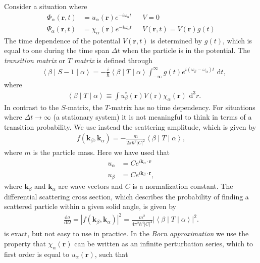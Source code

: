 \documentclass[10pt,twoside, b5paper,pdftex]{report}
\newcommand{\matrixel}[3]{\ensuremath{\left\langle #1 \middle| #2 \middle| #3 \right\rangle}}
\begin{document}
Consider a situation where
\begin{align}
    \Phi_{\alpha}( \mathbf{r},t) &= u_{\alpha}( \mathbf{r})e^{-i\omega_{\alpha} t} \mbox{   }& V = 0 \\
    \Psi_{\alpha}( \mathbf{r},t) &= \chi_{\alpha}( \mathbf{r})e^{-i\omega_{\alpha} t} \mbox{   }& V(\mathbf{r},t) = V(\mathbf{r})g(t) 
\end{align}
The time dependence of the potential $V(\mathbf{r},t)$ is determined by $g(t)$, which is equal to one during the time span $\Delta t$ when the particle is in the potential. The {\it transition matrix} or {\it $T$ matrix} is defined through
\begin{align}
    &\matrixel{\beta}{S-1}{\alpha} = -\frac{i}{\hbar}\matrixel{\beta}{T}{\alpha} \int_{-\infty}^{\infty}g(t)e^{i(\omega_{\beta}-\omega_{\alpha})t}\mbox{ d}t ,
\end{align}
where
\begin{align}    
    &\matrixel{\beta}{T}{\alpha} \equiv \int u_{\beta}^{*}( \mathbf{r}) V(\mbox{r}) \chi_{\alpha}( \mathbf{r}) \mbox{ d}^{3}r.
\end{align}
In contrast to the $S$-matrix, the $T$-matrix has no time dependency.
For situations where $\Delta t \to \infty$ (a stationary system) it is not meaningful to think in terms of a transition probability. We use instead the scattering amplitude, which is given by
\begin{align}
 	f(\mathbf{k}_{\beta},\mathbf{k}_{\alpha}) = -\frac{m}{2\pi\hbar^2|C|^2}\matrixel{\beta}{T}{\alpha} ,\label{eq:fex}
\end{align}
where $m$ is the particle mass. Here we have used that
\begin{align}
	u_{\alpha} &= C e^{i\mathbf{k}_{\alpha}\cdot\mathbf{r}} \\
	u_{\beta} &= C e^{i\mathbf{k}_{\beta}\cdot\mathbf{r}} ,
\end{align}
where $\mathbf{k}_{\beta}$ and $\mathbf{k}_{\alpha}$ are wave vectors and $C$ is a normalization constant. The differential scattering cross section, which describes the probability of finding a scattered particle within a given solid angle, is given by
\begin{align}
 	\frac{\mbox{d}\sigma}{\mbox{d}\Omega}= |f(\mathbf{k}_{\beta},\mathbf{k}_{\alpha})|^2 = \frac{m^2}{4\pi^2\hbar^4|C|^4}\left|\matrixel{\beta}{T}{\alpha}\right|^2. \label{eq:dscs}
\end{align}
 is exact, but not easy to use in practice. In the {\it Born approximation} we use the property that $\chi_{\alpha}(\mathbf{r})$ can be written as an infinite perturbation series, which to first order is equal to $u_{\alpha}(\mathbf{r})$, such that 
\end{document}
